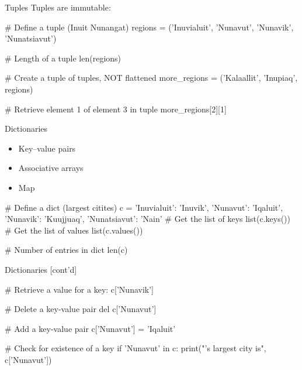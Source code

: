 \documentclass[ignorenonframetext,xcolor=x11names]{beamer}
\begin{document}
\begin{frame}[fragile]{Tuples}
Tuples are immutable:

\begin{pythoncode}
# Define a tuple (Inuit Nunangat)
regions = ('Inuvialuit', 'Nunavut', 'Nunavik', 'Nunatsiavut')

# Length of a tuple
len(regions)

# Create a tuple of tuples, NOT flattened
more_regions = ('Kalaallit', 'Inupiaq', regions)

# Retrieve element 1 of element 3 in tuple
more_regions[2][1]
\end{pythoncode}
\end{frame}

\begin{frame}[fragile]{Dictionaries}
\begin{itemize}
  \item Key--value pairs
  \item Associative arrays
  \item Map
\end{itemize}

\begin{pythoncode}
# Define a dict (largest citites)
c = {
    'Inuvialuit': 'Inuvik',
    'Nunavut': 'Iqaluit',
    'Nunavik': 'Kuujjuaq',
    'Nunatsiavut': 'Nain' 
}
# Get the list of keys
list(c.keys())
# Get the list of values
list(c.values())

# Number of entries in dict
len(c)
\end{pythoncode}
\end{frame}

\begin{frame}[fragile]{Dictionaries \small [cont'd]}
\begin{pythoncode}
# Retrieve a value for a key:
c['Nunavik']

# Delete a key-value pair
del c['Nunavut']

# Add a key-value pair
c['Nunavut'] = 'Iqaluit'

# Check for existence of a key
if 'Nunavut' in c:
    print("\nNunavut's largest city is", c['Nunavut'])
\end{pythoncode}
\end{frame}
\end{document}
